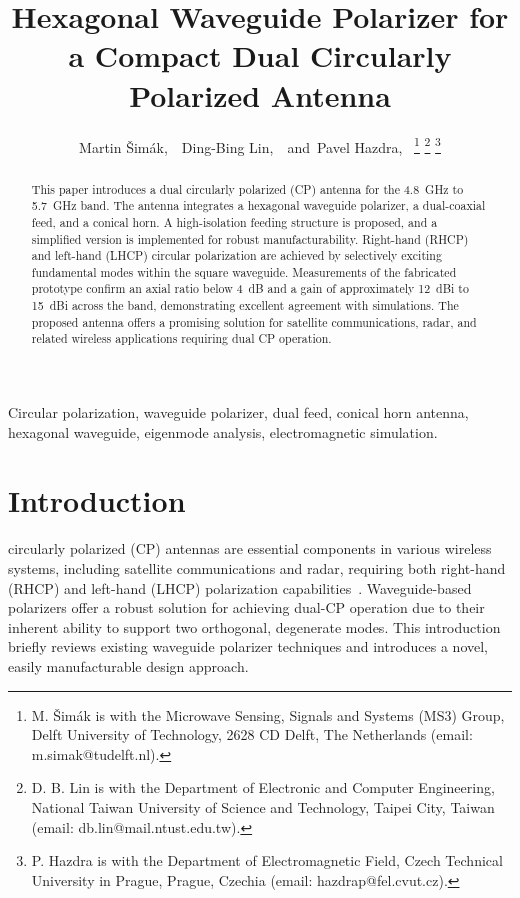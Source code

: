 \documentclass[journal]{IEEEtran}
\title{Hexagonal Waveguide Polarizer for a Compact Dual Circularly Polarized Antenna}
\author{Martin Šimák,~\IEEEmembership{Student Member,~IEEE,}~Ding-Bing Lin,~\IEEEmembership{Member,~IEEE,}~and~Pavel Hazdra,~\IEEEmembership{Member,~IEEE}%
\thanks{M. Šimák is with the Microwave Sensing, Signals and Systems (MS3) Group, Delft University of Technology, 2628 CD Delft, The Netherlands (email: m.simak@tudelft.nl).}%
\thanks{D. B. Lin is with the Department of Electronic and Computer Engineering, National Taiwan University of Science and Technology, Taipei City, Taiwan (email: db.lin@mail.ntust.edu.tw).}%
\thanks{P. Hazdra is with the Department of Electromagnetic Field, Czech Technical University in Prague, Prague, Czechia (email: hazdrap@fel.cvut.cz).}%
}
\begin{document}
\maketitle

\begin{abstract}
    This paper introduces a dual circularly polarized (CP) antenna for the 4.8~GHz to 5.7~GHz band. The antenna integrates a hexagonal waveguide polarizer, a dual-coaxial feed, and a conical horn. A high-isolation feeding structure is proposed, and a simplified version is implemented for robust manufacturability. Right-hand (RHCP) and left-hand (LHCP) circular polarization are achieved by selectively exciting fundamental modes within the square waveguide. Measurements of the fabricated prototype confirm an axial ratio below 4~dB and a gain of approximately 12~dBi to 15~dBi across the band, demonstrating excellent agreement with simulations. The proposed antenna offers a promising solution for satellite communications, radar, and related wireless applications requiring dual CP operation.
\end{abstract}

\begin{IEEEkeywords}
Circular polarization, waveguide polarizer, dual feed, conical horn antenna, hexagonal waveguide, eigenmode analysis, electromagnetic simulation.
\end{IEEEkeywords}

\section{Introduction}

 circularly polarized (CP) antennas are essential components in various wireless systems, including satellite communications and radar, requiring both right-hand (RHCP) and left-hand (LHCP) polarization capabilities~\cite{jia-et-al:dual-circularly-polarized-antennas-with-low-cross-polarization-for-gnss-r-applications, zang-et-al:single-layer-dual-circularly-polarized-antenna-elements-for-automotive-radar-at-77-ghz}. Waveguide-based polarizers offer a robust solution for achieving dual-CP operation due to their inherent ability to support two orthogonal, degenerate modes. This introduction briefly reviews existing waveguide polarizer techniques and introduces a novel, easily manufacturable design approach.
\end{document}
